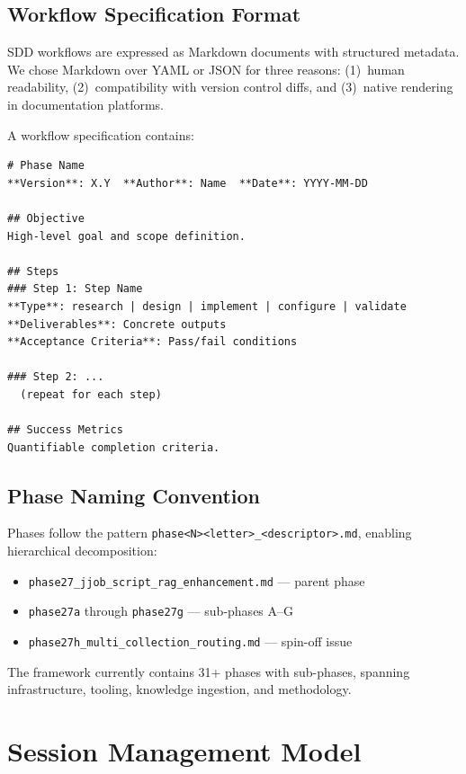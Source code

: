 \documentclass[11pt,letterpaper]{article}
\begin{document}
\subsection{Workflow Specification Format}

SDD workflows are expressed as Markdown documents with structured
metadata.  We chose Markdown over YAML or JSON for three reasons:
(1)~human readability, (2)~compatibility with version control diffs,
and (3)~native rendering in documentation platforms.

A workflow specification contains:

\begin{lstlisting}[language={},caption={SDD Workflow Specification Structure},label=lst:spec]
# Phase Name
**Version**: X.Y  **Author**: Name  **Date**: YYYY-MM-DD

## Objective
High-level goal and scope definition.

## Steps
### Step 1: Step Name
**Type**: research | design | implement | configure | validate
**Deliverables**: Concrete outputs
**Acceptance Criteria**: Pass/fail conditions

### Step 2: ...
  (repeat for each step)

## Success Metrics
Quantifiable completion criteria.
\end{lstlisting}

\subsection{Phase Naming Convention}

Phases follow the pattern
\texttt{phase<N><letter>\_<descriptor>.md}, enabling hierarchical
decomposition:

\begin{itemize}[nosep]
    \item \texttt{phase27\_jjob\_script\_rag\_enhancement.md} --- parent phase
    \item \texttt{phase27a} through \texttt{phase27g} --- sub-phases A--G
    \item \texttt{phase27h\_multi\_collection\_routing.md} --- spin-off issue
\end{itemize}

The framework currently contains 31+ phases with sub-phases, spanning
infrastructure, tooling, knowledge ingestion, and methodology.

\section{Session Management Model}
\label{sec:session}
\end{document}
